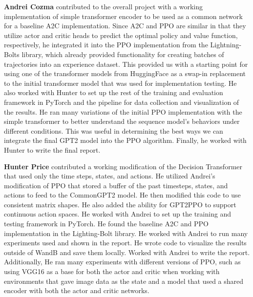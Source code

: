 \documentclass[conference]{IEEEtran}
\begin{document}
\textbf{Andrei Cozma} contributed to the overall project with a working implementation of simple transformer encoder to be used as a common network for a baseline A2C implementation. Since A2C and PPO are similar in that they utilize actor and critic heads to predict the optimal policy and value function, respectively, he integrated it into the PPO implementation from the Lightning-Bolts library, which already provided functionality for creating batches of trajectories into an experience dataset. This provided us with a starting point for using one of the transformer models from HuggingFace as a swap-in replacement to the initial transformer model that was used for implementation testing. He also worked with Hunter to set up the rest of the training and evaluation framework in PyTorch and the pipeline for data collection and visualization of the results. He ran many variations of the initial PPO implementation with the simple transformer to better understand the sequence model's behaviors under different conditions. This was useful in determining the best ways we can integrate the final GPT2 model into the PPO algorithm. Finally, he worked with Hunter to write the final report.


\textbf{Hunter Price} contributed a working modification of the Decision Transformer that used only the time steps, states, and actions. He utilized Andrei's modification of PPO that stored a buffer of the past timesteps, states, and actions to feed to the CommonGPT2 model. He then modified this code to use consistent matrix shapes. He also added the ability for GPT2PPO to support continuous action spaces. He worked with Andrei to set up the training and testing framework in PyTorch. He found the baseline A2C and PPO implementation in the Lighting-Bolt library. He worked with Andrei to run many experiments used and shown in the report. He wrote code to visualize the results outside of WandB and save them locally. Worked with Andrei to write the report. Additionally, He ran many experiments with different versions of PPO, such as using VGG16 as a base for both the actor and critic when working with environments that gave image data as the state and a model that used a shared encoder with both the actor and critic networks.

\end{document}
